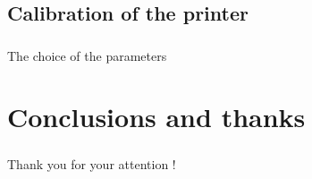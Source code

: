 \documentclass{beamer}
\begin{document}
\subsection{Calibration of the printer}
\begin{frame}
	\frametitle{}

    \begin{block}{The choice of the parameters}
    \end{block}
\end{frame}

\section{Conclusions and thanks}
\begin{frame}
	\frametitle{}

    \begin{block}{}
    \end{block}
\end{frame}

\begin{frame}
	\frametitle{}

    \begin{center}
    \Large{Thank you for your attention !}
    \end{center}
\end{frame}
	
\end{document}
